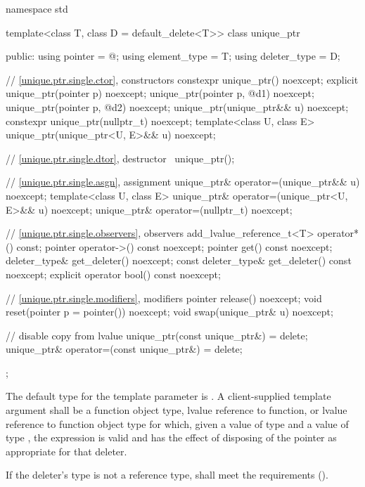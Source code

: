 %
\begin{codeblock}
namespace std {
  template<class T, class D = default_delete<T>> class unique_ptr {
  public:
    using pointer      = @\seebelow@;
    using element_type = T;
    using deleter_type = D;

    // \ref{unique.ptr.single.ctor}, constructors
    constexpr unique_ptr() noexcept;
    explicit unique_ptr(pointer p) noexcept;
    unique_ptr(pointer p, @\seebelow@ d1) noexcept;
    unique_ptr(pointer p, @\seebelow@ d2) noexcept;
    unique_ptr(unique_ptr&& u) noexcept;
    constexpr unique_ptr(nullptr_t) noexcept;
    template<class U, class E>
      unique_ptr(unique_ptr<U, E>&& u) noexcept;

    // \ref{unique.ptr.single.dtor}, destructor
    ~unique_ptr();

    // \ref{unique.ptr.single.asgn}, assignment
    unique_ptr& operator=(unique_ptr&& u) noexcept;
    template<class U, class E>
      unique_ptr& operator=(unique_ptr<U, E>&& u) noexcept;
    unique_ptr& operator=(nullptr_t) noexcept;

    // \ref{unique.ptr.single.observers}, observers
    add_lvalue_reference_t<T> operator*() const;
    pointer operator->() const noexcept;
    pointer get() const noexcept;
    deleter_type& get_deleter() noexcept;
    const deleter_type& get_deleter() const noexcept;
    explicit operator bool() const noexcept;

    // \ref{unique.ptr.single.modifiers}, modifiers
    pointer release() noexcept;
    void reset(pointer p = pointer()) noexcept;
    void swap(unique_ptr& u) noexcept;

    // disable copy from lvalue
    unique_ptr(const unique_ptr&) = delete;
    unique_ptr& operator=(const unique_ptr&) = delete;
  };
}
\end{codeblock}

\pnum
The default type for the template parameter  is
. A client-supplied template argument
 shall be a function
object type, lvalue reference to function, or
lvalue reference to function object type
for which, given
a value  of type  and a value
 of type , the expression
 is valid and has the effect of disposing of the
pointer as appropriate for that deleter.

\pnum
If the deleter's type  is not a reference type,  shall meet
the  requirements ().

